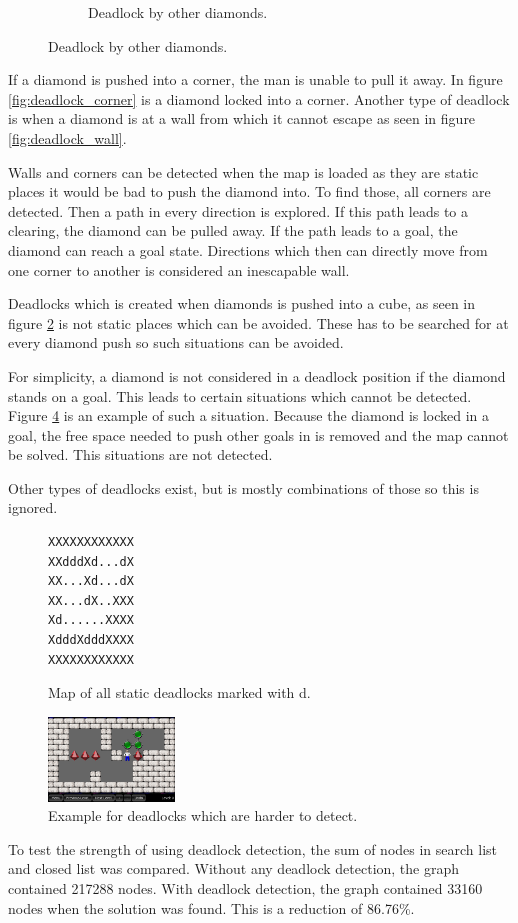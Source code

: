 \begin{figure}
\begin{subfigure}{0.3\textwidth}
  \caption{Deadlock by other diamonds.}
  \label{fig:deadlock_diamond}
\end{subfigure}
\end{figure}

If a diamond is pushed into a corner, the man is unable to pull it away.
In figure \ref{fig:deadlock_corner} is a diamond locked into a corner.
Another type of deadlock is when a diamond is at a wall from which it cannot escape as seen in figure \ref{fig:deadlock_wall}.

Walls and corners can be detected when the map is loaded as they are static places it would be bad to push the diamond into.
To find those, all corners are detected.
Then a path in every direction is explored. 
If this path leads to a clearing, the diamond can be pulled away.
If the path leads to a goal, the diamond can reach a goal state.
Directions which then can directly move from one corner to another is considered an inescapable wall.

Deadlocks which is created when diamonds is pushed into a cube, as seen in figure \ref{fig:deadlock_diamond} is not static places which can be avoided.
These has to be searched for at every diamond push so such situations can be avoided.

For simplicity, a diamond is not considered in a deadlock position if the diamond stands on a goal.
This leads to certain situations which cannot be detected.
Figure \ref{fig:deadlock_hard} is an example of such a situation.
Because the diamond is locked in a goal, the free space needed to push other goals in is removed and the map cannot be solved.
This situations are not detected.

Other types of deadlocks exist, but is mostly combinations of those so this is ignored.

\begin{figure}
 \centering
 \begin{minipage}{0.1\textwidth}
\begin{verbatim}
XXXXXXXXXXXX
XXdddXd...dX
XX...Xd...dX
XX...dX..XXX
Xd......XXXX
XdddXdddXXXX
XXXXXXXXXXXX
\end{verbatim}
 \end{minipage}
 \caption{Map of all static deadlocks marked with d.}
 \label{fig:wavefront}
\end{figure}

\begin{figure}
  \centering
  \includegraphics[width=0.3\textwidth]{img/deadlock_hard}
  \caption{Example for deadlocks which are harder to detect.}
  \label{fig:deadlock_hard}
\end{figure}

To test the strength of using deadlock detection, the sum of nodes in search list and closed list was compared.
Without any deadlock detection, the graph contained 217288 nodes.
With deadlock detection, the graph contained 33160 nodes when the solution was found.
This is a reduction of 86.76\%. 
